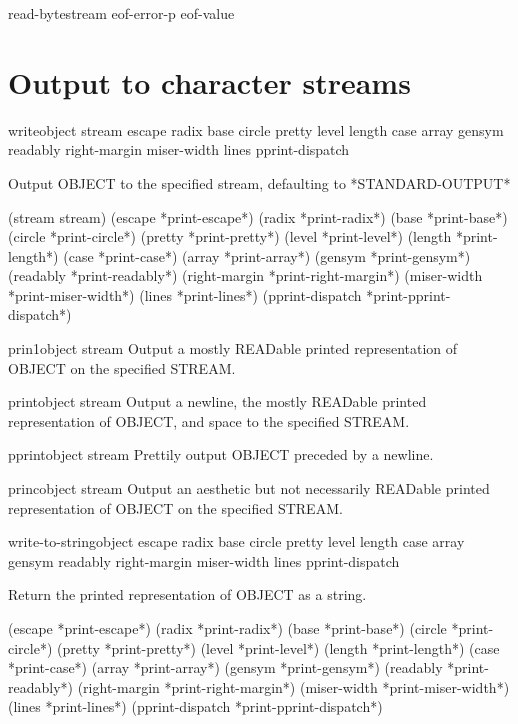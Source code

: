 \documentclass[10pt,english]{book}
\begin{document}
\begin{function}{read-byte}{stream \op eof-error-p eof-value}
  
\end{function}

\section{Output to character streams}
\label{sec:outp-char-stre}

\begin{function}{write}{object \key stream escape radix base circle
    pretty level length case array gensym readably right-margin
    miser-width lines pprint-dispatch}

  Output OBJECT to the specified stream, defaulting to
  *STANDARD-OUTPUT*

(stream stream) (escape *print-escape*) (radix *print-radix*)
 (base *print-base*) (circle *print-circle*) (pretty *print-pretty*)
 (level *print-level*) (length *print-length*) (case *print-case*)
 (array *print-array*) (gensym *print-gensym*) (readably *print-readably*)
 (right-margin *print-right-margin*) (miser-width *print-miser-width*)
 (lines *print-lines*) (pprint-dispatch *print-pprint-dispatch*)
\end{function}

\begin{function}{prin1}{object \op stream}
  Output a mostly READable printed representation of OBJECT on the specified
  STREAM.
\end{function}

\begin{function}{print}{object \op stream}
  Output a newline, the mostly READable printed representation of OBJECT, and
  space to the specified STREAM.
\end{function}

\begin{function}{pprint}{object \op stream}
  Prettily output OBJECT preceded by a newline.
\end{function}

\begin{function}{princ}{object \op stream}
  Output an aesthetic but not necessarily READable printed representation
  of OBJECT on the specified STREAM.
\end{function}

\begin{function}{write-to-string}{object \key escape radix base circle
    pretty level length case array gensym readably right-margin
    miser-width lines pprint-dispatch}

  Return the printed representation of OBJECT as a string.

(escape *print-escape*) (radix *print-radix*) (base *print-base*)
 (circle *print-circle*) (pretty *print-pretty*) (level *print-level*)
 (length *print-length*) (case *print-case*) (array *print-array*)
 (gensym *print-gensym*) (readably *print-readably*)
 (right-margin *print-right-margin*) (miser-width *print-miser-width*)
 (lines *print-lines*) (pprint-dispatch *print-pprint-dispatch*)
\end{function}
\end{document}

